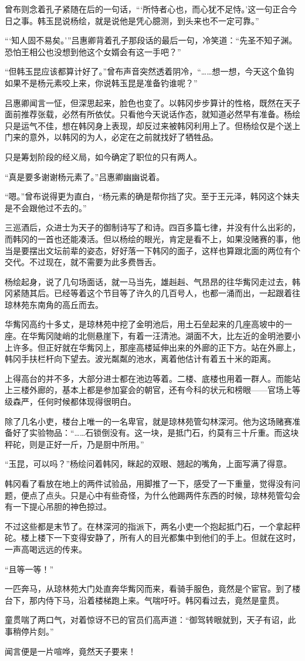 曾布则念着孔子紧随在后的一句话，“‘所恃者心也，而心犹不足恃。’这一句正合今日之事。韩玉昆说杨绘，就是说他是凭心臆测，到头来也不一定可靠。”

“‘知人固不易矣。’”吕惠卿背着孔子那段话的最后一句，冷笑道：“先圣不知子渊。恐怕王相公也没想到他这个女婿会有这一手吧？”

“但韩玉昆应该都算计好了。”曾布声音突然透着阴冷，“……想一想，今天这个鱼钩如果不是杨元素咬上来，你说韩玉昆是准备钓谁呢？”

吕惠卿闻言一怔，但深思起来，脸色也变了。以韩冈步步算计的性格，既然在天子面前推荐张载，必然有所依仗。只看他今天说话作态，就知道必然早有准备。杨绘只是运气不佳，想在韩冈身上表现，却反过来被韩冈利用上了。但杨绘仅是个送上门来的意外，以韩冈的为人，必定在之前就找好了牺牲品。

只是筹划阶段的经义局，如今确定了职位的只有两人。

“真是要多谢谢杨元素了。”吕惠卿幽幽说着。

“嗯。”曾布说得更为直白，“杨元素的确是帮你挡了灾。至于王元泽，韩冈这个妹夫是不会跟他过不去的。”

三巡酒后，众进士为天子的御制诗写了和诗。四百多篇七律，并没有什么出彩的，而韩冈的一首也还能凑活。但以杨绘的眼光，肯定是看不上，如果没赌赛的事，他当是要摆出文坛前辈的姿态，好好落一下韩冈的面子，这样也算跟北面的两位有个交代。不过现在，就不需要为此多费唇舌。

杨绘起身，说了几句场面话，就一马当先，雄赳赳、气昂昂的往华觜冈走过去，韩冈紧随其后。已经等着这个节目等了许久的几百号人，也都一涌而出，一起跟着往琼林苑东南角的高丘而去。

华觜冈高约十多丈，是琼林苑中挖了金明池后，用土石垒起来的几座高坡中的一座。在华觜冈陡峭的北侧悬崖下，有着一汪清池。湖面不大，比左近的金明池要小上许多。但正好就在华觜冈上，那座高楼延伸出来的外廊的正下方。站在外廊上，韩冈手扶栏杆向下望去。波光粼粼的池水，离着他估计有着五十米的距离。

上得高台的并不多，大部分进士都在池边等着。二楼、底楼也用着一群人。而能站上三楼外廊的，基本上都是参加宴会的朝官，还有今科的状元和榜眼——官场上等级森严，任何时候都体现得很明白。

除了几名小吏，楼台上唯一的一名卑官，就是琼林苑管勾林深河。他为这场赌赛准备好了实验物品：“……石锁倒没有。这一块，是抵门石，约莫有三十斤重。而这块秤砣，则是正好一斤，乃是厨中所用。”

“玉昆，可以吗？”杨绘问着韩冈，眯起的双眼、翘起的嘴角，上面写满了得意。

韩冈看了看放在地上的两件试验品，用脚推了一下，感受了一下重量，觉得没有问题，便点了点头。只是心中有些奇怪，为什么他踢两件东西的时候，琼林苑管勾会有一下提心吊胆的神色掠过。

不过这些都是末节了。在林深河的指派下，两名小吏一个抱起抵门石，一个拿起秤砣。楼上楼下一下变得安静了，所有人的目光都集中到他们的手上。但就在这时，一声高喝远远的传来。

“且等一等！”

一匹奔马，从琼林苑大门处直奔华觜冈而来，看骑手服色，竟然是个宦官。到了楼台下，那内侍下马，沿着楼梯跑上来。气喘吁吁。韩冈看过去，竟然是童贯。

童贯喘了两口气，对着惊讶不已的官员们高声道：“御驾转眼就到，天子有诏，此事稍停片刻。”

闻言便是一片喧哗，竟然天子要来！

